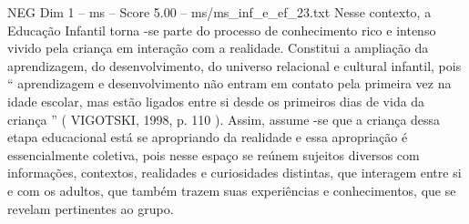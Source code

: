 \begin{textsample}{NEG Dim 1 – ms – Score 5.00 – ms/ms\_inf\_e\_ef\_23.txt}
Nesse contexto, a Educação Infantil torna -se parte do processo de conhecimento rico e intenso vivido pela criança em interação com a realidade.
Constitui a ampliação da aprendizagem, do desenvolvimento, do universo relacional e cultural infantil, pois “ aprendizagem e desenvolvimento não entram em contato pela primeira vez na idade escolar, mas estão ligados entre si desde os primeiros dias de vida da criança ” ( VIGOTSKI, 1998, p. 110 ).
Assim, assume -se que a criança dessa etapa educacional está se apropriando da realidade e essa apropriação é essencialmente coletiva, pois nesse espaço se reúnem sujeitos diversos com informações, contextos, realidades e curiosidades distintas, que interagem entre si e com os adultos, que também trazem suas experiências e conhecimentos, que se revelam pertinentes ao grupo.

\end{textsample}
